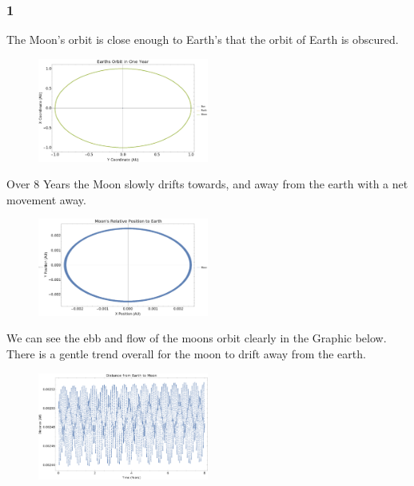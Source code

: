\documentclass{article}
\begin{document}
\subsubsection{1}

The Moon's orbit is close enough to Earth's that the orbit of Earth is obscured.

\begin{figure}[!htb]
	\begin{center}
		\includegraphics[width=0.5\textwidth]{p1-1a.pdf}
	\end{center}
	\caption{}
\label{fig:qual}
\end{figure}
\FloatBarrier

Over 8 Years the Moon slowly drifts towards, and away from the earth with a net movement away.

\begin{figure}[!htb]
	\begin{center}
		\includegraphics[width=0.5\textwidth]{p1-1b.pdf}
	\end{center}
	\caption{}
\label{fig:qual}
\end{figure}
\FloatBarrier

We can see the ebb and flow of the moons orbit clearly in the Graphic below. There is a gentle trend overall for the moon to drift away from the earth.

\begin{figure}[!htb]
	\begin{center}
		\includegraphics[width=0.5\textwidth]{p1-1c.pdf}
	\end{center}
	\caption{}
\label{fig:qual}
\end{figure}
\FloatBarrier
\end{document}
